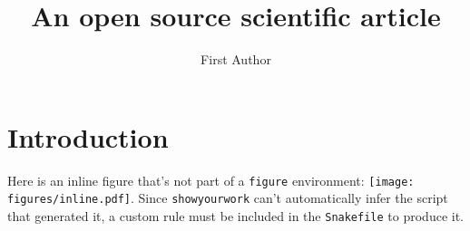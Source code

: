 \documentclass[twocolumn]{aastex631}
\begin{document}
\title{An open source scientific article}

\author{First Author}

\begin{abstract}
    \blindtext
\end{abstract}

\section{Introduction}
\Blindtext[4]

Here is an inline figure that's not part of a \verb+figure+ environment: \texttt{[image: figures/inline.pdf]}. Since \texttt{showyourwork} can't automatically infer the script that generated it, a custom rule must be included in the \texttt{Snakefile} to produce it.
\end{document}
